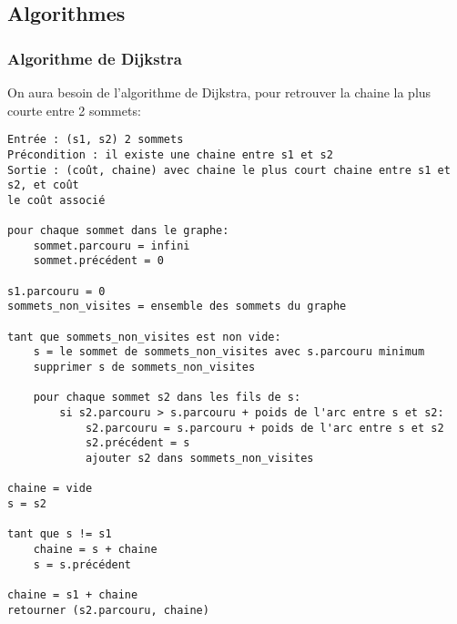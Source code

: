 \documentclass{scrartcl}
\begin{document}
  \subsection{Algorithmes}
    \subsubsection{Algorithme de Dijkstra}
      On aura besoin de l'algorithme de Dijkstra, pour retrouver la chaine
      la plus courte entre 2 sommets:
      \begin{lstlisting}
Entrée : (s1, s2) 2 sommets
Précondition : il existe une chaine entre s1 et s2
Sortie : (coût, chaine) avec chaine le plus court chaine entre s1 et s2, et coût
le coût associé

pour chaque sommet dans le graphe:
    sommet.parcouru = infini
    sommet.précédent = 0

s1.parcouru = 0
sommets_non_visites = ensemble des sommets du graphe

tant que sommets_non_visites est non vide:
    s = le sommet de sommets_non_visites avec s.parcouru minimum
    supprimer s de sommets_non_visites

    pour chaque sommet s2 dans les fils de s:
        si s2.parcouru > s.parcouru + poids de l'arc entre s et s2:
            s2.parcouru = s.parcouru + poids de l'arc entre s et s2
            s2.précédent = s
            ajouter s2 dans sommets_non_visites

chaine = vide
s = s2

tant que s != s1
    chaine = s + chaine
    s = s.précédent

chaine = s1 + chaine
retourner (s2.parcouru, chaine)
      \end{lstlisting}
\end{document}
